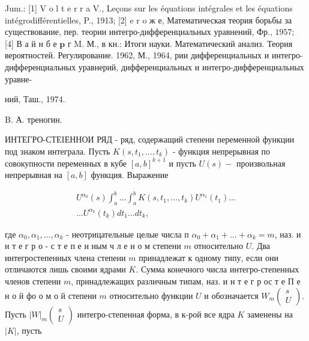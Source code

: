 \documentclass[10pt]{article}
\begin{document}
Jum.: [1] V o l t e r r a V., Leçons sur les équations intégrales et les équations intégrodifférentielles, P., 1913; [2] e r o ж е, Математическая теория борьбы за существование, пер. теории интегро-дифференциальных уравнений, Фр., $1957 ;$ [4] В а й н б е $\mathbf{p}$ г M. М., в кн.: Итоги науки. Математический анализ. Теория вероятностей. Регулирование. 1962, М., 1964, рии дифференциальных и интегро-дифференциальных уравнерий, дифференциальных и интегро-дифференциальных уравне-

ний, Таш., 1974.

B. А. треногин.



ИНТЕГРО-СТЕIЕННОИ РЯД - ряд, содержащий степени переменной функции под знаком интеграла. Пусть $K\left(s, t_{1}, \ldots, t_{k}\right)$ - функция непрерывная по совокупности переменных в кубе $[a, b]^{k+1}$ и пусть $U(s)-$ произвольная непрерывная на $[a, b]$ функция. Выражение



\[

\begin{gathered}

U^{\alpha_{0}}(s) \int_{a}^{b} \ldots \int_{a}^{b} K\left(s, t_{1}, \ldots, t_{k}\right) U^{\alpha_{1}}\left(t_{1}\right) \ldots \\

\ldots U^{\alpha_{k}}\left(t_{k}\right) d t_{1} \ldots d t_{k},

\end{gathered}

\]



где $\alpha_{0}, \alpha_{1}, \ldots, \alpha_{k}$ - неотрицательные целые числа п $\alpha_{0}+\alpha_{1}+\ldots+\alpha_{k}=m$, наз. и н т е г р о - с т е п е н ным ч л е н о м степени $m$ относительно $U$. Два интегростепенных члена степени $m$ принадлежат к одному типу, если они отличаются лишь своими ядрами $K$. Сумма конечного числа интегро-степенных членов степени $m$, принадлежащих различным типам, наз. и н т е г р ос т е П е н о й фо о м о й степени $m$ относительно функции $U$ и обозначается $W_{m}\left(\begin{array}{l}s \\ U\end{array}\right)$. Пусть $|W|_{m}\left(\begin{array}{l}s \\ U\end{array}\right)$ интегро-степенная форма, в к-рой все ядра $K$ заменены на $|K|$, пусть
\end{document}
